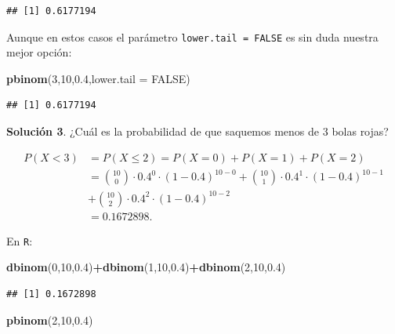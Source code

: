 \documentclass[]{book}
\newenvironment{Shaded}{\begin{snugshade}}{\end{snugshade}}
\newcommand{\DataTypeTok}[1]{\textcolor[rgb]{0.13,0.29,0.53}{#1}}
\newcommand{\DecValTok}[1]{\textcolor[rgb]{0.00,0.00,0.81}{#1}}
\newcommand{\FloatTok}[1]{\textcolor[rgb]{0.00,0.00,0.81}{#1}}
\newcommand{\KeywordTok}[1]{\textcolor[rgb]{0.13,0.29,0.53}{\textbf{#1}}}
\newcommand{\NormalTok}[1]{#1}
\newcommand{\OperatorTok}[1]{\textcolor[rgb]{0.81,0.36,0.00}{\textbf{#1}}}
\newcommand{\OtherTok}[1]{\textcolor[rgb]{0.56,0.35,0.01}{#1}}
\begin{document}
\begin{verbatim}
## [1] 0.6177194
\end{verbatim}

Aunque en estos casos el parámetro \texttt{lower.tail\ =\ FALSE} es sin duda nuestra mejor opción:

\begin{Shaded}
\begin{Highlighting}[]
\KeywordTok{pbinom}\NormalTok{(}\DecValTok{3}\NormalTok{,}\DecValTok{10}\NormalTok{,}\FloatTok{0.4}\NormalTok{,}\DataTypeTok{lower.tail =} \OtherTok{FALSE}\NormalTok{)}
\end{Highlighting}
\end{Shaded}

\begin{verbatim}
## [1] 0.6177194
\end{verbatim}

\textbf{Solución 3}. ¿Cuál es la probabilidad de que saquemos menos de \(3\) bolas rojas?

\[
\begin{array}{ll}
P(X< 3)&= P(X\leq 2)=  P(X=0)+P(X=1)+P(X=2)\\
&=
{10\choose 0}\cdot 0.4^0\cdot (1-0.4)^{10-0}+ {10\choose 1}\cdot 0.4^1\cdot (1-0.4)^{10-1}\\
&+
{10\choose 2}\cdot 0.4^2\cdot (1-0.4)^{10-2}\\
&=0.1672898.
\end{array}
\]

En \texttt{R}:

\begin{Shaded}
\begin{Highlighting}[]
\KeywordTok{dbinom}\NormalTok{(}\DecValTok{0}\NormalTok{,}\DecValTok{10}\NormalTok{,}\FloatTok{0.4}\NormalTok{)}\OperatorTok{+}\KeywordTok{dbinom}\NormalTok{(}\DecValTok{1}\NormalTok{,}\DecValTok{10}\NormalTok{,}\FloatTok{0.4}\NormalTok{)}\OperatorTok{+}\KeywordTok{dbinom}\NormalTok{(}\DecValTok{2}\NormalTok{,}\DecValTok{10}\NormalTok{,}\FloatTok{0.4}\NormalTok{)}
\end{Highlighting}
\end{Shaded}

\begin{verbatim}
## [1] 0.1672898
\end{verbatim}

\begin{Shaded}
\begin{Highlighting}[]
\KeywordTok{pbinom}\NormalTok{(}\DecValTok{2}\NormalTok{,}\DecValTok{10}\NormalTok{,}\FloatTok{0.4}\NormalTok{)}
\end{Highlighting}
\end{Shaded}
\end{document}
